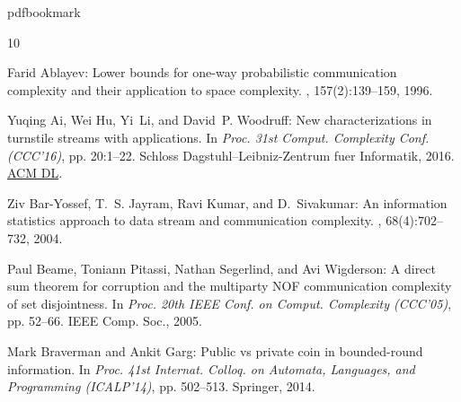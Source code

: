 \newcommand{\prelim}{Preliminary version in\ }\newcommand{\prelims}{Preliminary
  versions in\ }
\providecommand{\bibhead}[1]{}
\expandafter\ifx\csname pdfbookmark\endcsname\relax%
  \providecommand{\tocrefpdfbookmark}{}
\else\providecommand{\tocrefpdfbookmark}{%
   \hypertarget{tocreferences}{}%
   \pdfbookmark[1]{References}{tocreferences}}%
\fi

\tocrefpdfbookmark
\begin{thebibliography}{10}

\bibhead{ablayev1996lower}
{\sc Farid Ablayev}: Lower bounds for one-way probabilistic communication
  complexity and their application to space complexity.
, 157(2):139--159, 1996.
\newblock [\epfmtdoi{10.1016/0304-3975(95)00157-3}]

\bibhead{AHLW16}
{\sc Yuqing Ai, Wei Hu, Yi~Li, and David~P. Woodruff}: New characterizations in
  turnstile streams with applications.
\newblock In {\em Proc. 31st Comput. Complexity Conf. (CCC'16)}, pp. 20:1--22.
  Schloss Dagstuhl--Leibniz-Zentrum fuer Informatik, 2016.
\newblock \href{https://dl.acm.org/doi/10.5555/2982445.2982465}{ACM DL}.

\bibhead{BarYossef:2004eya}
{\sc Ziv Bar-Yossef, T.~S. Jayram, Ravi Kumar, and D.~Sivakumar}: An
  information statistics approach to data stream and communication complexity.
, 68(4):702--732, 2004.

\bibhead{BPSW05}
{\sc Paul Beame, Toniann Pitassi, Nathan Segerlind, and Avi Wigderson}: A
  direct sum theorem for corruption and the multiparty {NOF} communication
  complexity of set disjointness.
\newblock In {\em Proc. 20th IEEE Conf. on Comput. Complexity (CCC'05)}, pp.
  52--66. IEEE Comp. Soc., 2005.

\bibhead{bg14}
{\sc Mark Braverman and Ankit Garg}: Public vs private coin in bounded-round
  information.
\newblock In {\em Proc. 41st Internat. Colloq. on Automata, Languages, and
  Programming (ICALP'14)}, pp. 502--513. Springer, 2014.
\newblock [\epfmtdoi{10.1007/978-3-662-43948-7\_42}]


\end{thebibliography}
